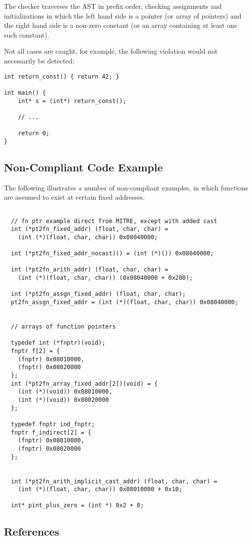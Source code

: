 The checker traverses the AST in prefix order, checking assignments and
initializations in which the left hand side is a pointer (or array of pointers)
and the right hand side is a non-zero constant (or an array containing at least
one such constant).

Not all cases are caught, for example, the following violation would not
necessarily be detected:

\begin{verbatim}
int return_const() { return 42; }

int main() {
    int* s = (int*) return_const();

    // ...

    return 0;
}
\end{verbatim}


\subsection{Non-Compliant Code Example}


The following illustrates a number of non-compliant examples, in which functions
are assumed to exist at certain fixed addresses.

\begin{verbatim}

  // fn ptr example direct from MITRE, except with added cast
  int (*pt2fn_fixed_addr) (float, char, char) = 
    (int (*)(float, char, char)) 0x08040000;

  int (*pt2fn_fixed_addr_nocast)() = (int (*)()) 0x08040000;

  int (*pt2fn_arith_addr) (float, char, char) = 
    (int (*)(float, char, char)) (0x08040000 + 0x200);

  int (*pt2fn_assgn_fixed_addr) (float, char, char);
  pt2fn_assgn_fixed_addr = (int (*)(float, char, char)) 0x08040000;


  // arrays of function pointers

  typedef int (*fnptr)(void);
  fnptr f[2] = {
    (fnptr) 0x08010000,
    (fnptr) 0x08020000
  };
  int (*pt2fn_array_fixed_addr[2])(void) = {
    (int (*)(void)) 0x08010000,
    (int (*)(void)) 0x08020000
  };

  typedef fnptr ind_fnptr;
  fnptr f_indirect[2] = {
    (fnptr) 0x08010000,
    (fnptr) 0x08020000
  };


  int (*pt2fn_arith_implicit_cast_addr) (float, char, char) = 
    (int (*)(float, char, char)) 0x08010000 + 0x10;

  int* pint_plus_zero = (int *) 0x2 + 0;
\end{verbatim}

\subsection{References}

